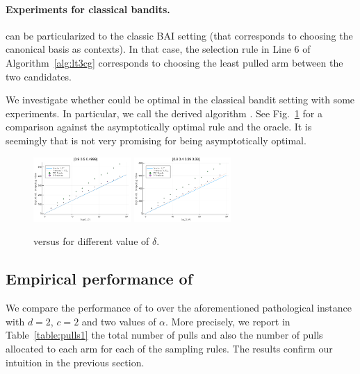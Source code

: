 \paragraph{Experiments for classical bandits.}
\LTCCG can be particularized to the classic BAI setting (that corresponds to choosing the canonical basis as contexts). In that case, the selection rule in Line 6 of Algorithm~\ref{alg:lt3cg} corresponds to choosing the least pulled arm between the two candidates. 

We investigate whether \LTCCG{} could be optimal in the classical bandit setting with some experiments. In particular, we call the derived algorithm \TCCG{}. See Fig.~\ref{fig:convergence} for a comparison against the asymptotically optimal \DT rule and the oracle. It is seemingly that \LTCCG{} is not very promising for being asymptotically optimal.

\begin{figure}[ht]
    \centering
    \includegraphics[width=0.33\textwidth]{Chapter4/img/res1.pdf}
    \includegraphics[width=0.33\textwidth]{Chapter4/img/res2.pdf}
    \caption{\TCCG{} versus \Track{} for different value of $\delta$.}
    \label{fig:convergence}
\end{figure}

\subsection{Empirical performance of \LTCCG{}}
We compare the performance of \LTCCG{} to \LGapE{} over the aforementioned pathological instance with $d=2$, $c=2$ and two values of $\alpha$. More precisely, we report in Table~\ref{table:pulls1} the total number of pulls and also the number of pulls allocated to each arm for each of the sampling rules. The results confirm our intuition in the previous section. 

